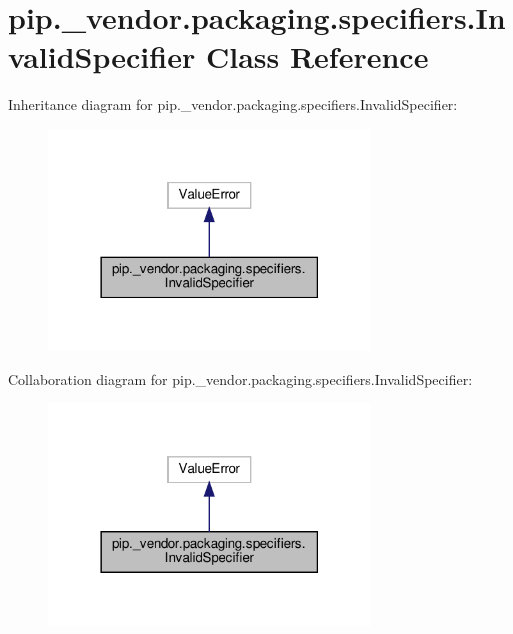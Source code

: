 \hypertarget{classpip_1_1__vendor_1_1packaging_1_1specifiers_1_1InvalidSpecifier}{}\section{pip.\+\_\+vendor.\+packaging.\+specifiers.\+Invalid\+Specifier Class Reference}
\label{classpip_1_1__vendor_1_1packaging_1_1specifiers_1_1InvalidSpecifier}


Inheritance diagram for pip.\+\_\+vendor.\+packaging.\+specifiers.\+Invalid\+Specifier\+:
\nopagebreak
\begin{figure}[H]
\begin{center}
\leavevmode
\includegraphics[width=242pt]{classpip_1_1__vendor_1_1packaging_1_1specifiers_1_1InvalidSpecifier__inherit__graph}
\end{center}
\end{figure}


Collaboration diagram for pip.\+\_\+vendor.\+packaging.\+specifiers.\+Invalid\+Specifier\+:
\nopagebreak
\begin{figure}[H]
\begin{center}
\leavevmode
\includegraphics[width=242pt]{classpip_1_1__vendor_1_1packaging_1_1specifiers_1_1InvalidSpecifier__coll__graph}
\end{center}
\end{figure}


